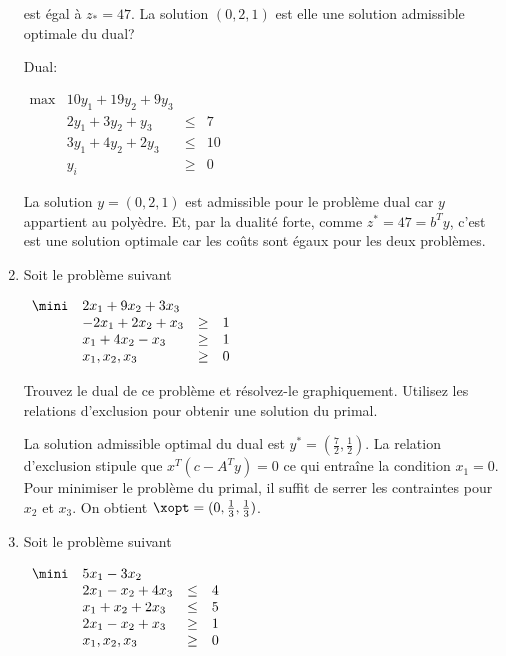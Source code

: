 \begin{enumerate}
    est égal à $z_*=47$. La solution $(0, 2, 1)$ est elle une solution admissible optimale du dual?


    \begin{solution}
      Dual:

      $
      \begin{array}{llcr}
        \max & 10y_{1} + 19y_{2} + 9y_{3}\\
        & 2y_{1} + 3y_{2} + y_{3} & \leq & 7\\
        & 3y_{1} + 4y_{2} + 2y_{3} & \leq & 10\\
        & y_{i} & \geq & 0
      \end{array}
      $

      La solution $y = (0,2,1)$ est admissible pour le problème dual car
      $y$ appartient au polyèdre.
      Et, par la dualité forte,
      comme $z^{*} = 47 = b^Ty$,
      c'est est une solution optimale
      car les coûts sont égaux pour les deux problèmes.
    \end{solution}

  \item Soit le problème suivant

    $
    \begin{array}{llcr}
      \mini & 2x_1+9x_2+3x_3\\
      & -2x_1+2x_2 +x_3 & \geq & 1\\
      & x_1+4x_2 -x_3 & \geq & 1\\
      & x_1, x_2, x_3 & \geq & 0
    \end{array}
    $

    Trouvez le dual de ce problème et résolvez-le graphiquement. Utilisez les relations d'exclusion pour obtenir une solution du primal.

    \begin{solution}
      La solution admissible optimal du dual est
      $y^{*} = (\frac{7}{2}, \frac{1}{2})$.
      La relation d'exclusion stipule que $x^{T}(c-A^{T}y) = 0$
      ce qui entraîne la condition $x_{1} = 0$.
      Pour minimiser le problème du primal,
      il suffit de serrer les contraintes pour $x_{2}$ et $x_{3}$.
      On obtient $\xopt = (0, \frac{1}{3}, \frac{1}{3})$.
    \end{solution}

  \item Soit le problème suivant

    $
    \begin{array}{llcr}
      \mini & 5x_1-3x_2\\
      & 2x_1-x_2 +4x_3 & \leq & 4\\
      & x_1+x_2 +2x_3 & \leq & 5\\
      & 2x_1-x_2 +x_3 & \geq & 1\\
      & x_1, x_2, x_3 & \geq & 0
    \end{array}
    $


\end{enumerate}

